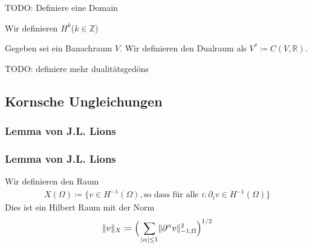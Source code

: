 \documentclass{scrartcl}
\def\R{\mathbb{R}}
\def\Z{\mathbb{Z}}
\newcommand{\norm}[1]{\lVert #1 \rVert}
\DeclarePairedDelimiter{\abs}{|}{|}
\begin{document}
TODO: Definiere eine Domain

Wir definieren $H^k$($k\in\Z$) 

Gegeben sei ein Banachraum $V$. Wir definieren den Dualraum als $V^*\coloneqq C(V,\R)$.

TODO: definiere mehr dualitätsgedöns


%

\subsection*{Kornsche Ungleichungen}

\subsubsection*{Lemma von J.L. Lions}

\subsubsection*{Lemma von J.L. Lions}


Wir definieren den Raum
\begin{align*}
	X(\Omega)\coloneqq\{v\in H^{-1}(\Omega), \text{so dass für alle }i\colon\partial_iv\in H^{-1}(\Omega)\}
\end{align*}
Dies ist ein Hilbert Raum mit der Norm
\begin{align*}
	\norm{v}_X\coloneqq\Big(\sum_{\abs{\alpha}\leq1}\norm{\partial^\alpha v}_{-1,\Omega}^2\Big)^{1/2}
\end{align*}
\end{document}
